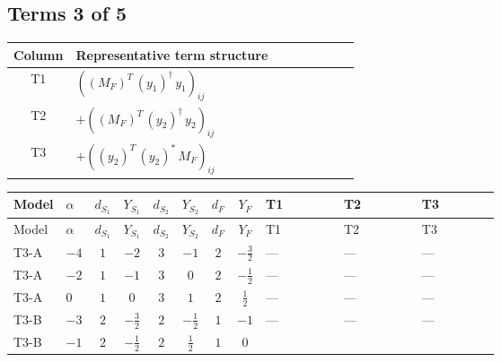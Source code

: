 \documentclass[8pt]{article}
\begin{document}
\begin{landscape}
\subsection*{Terms 3 of 5}
\begin{center}
\begin{tabular}{@{}c >{\raggedright\arraybackslash}p{0.82\linewidth}@{}}
\toprule
Column & Representative term structure \\
\midrule
T1 & \(\displaystyle \left(\left({M_F}\right)^{T}\,\left({y_1}\right)^{\dagger}\,{y_1}\right)_{ij}\) \\
\midrule
T2 & \(\displaystyle +\left(\left({M_F}\right)^{T}\,\left({y_2}\right)^{\dagger}\,{y_2}\right)_{ij}\) \\
\midrule
T3 & \(\displaystyle +\left(\left({y_2}\right)^{T}\,\left({y_2}\right)^{*}\,{M_F}\right)_{ij}\) \\
\midrule
\bottomrule
\end{tabular}
\end{center}
\smallskip
\tiny
\begin{longtable}{@{}llcccccc >{\raggedright\arraybackslash}p{0.21\linewidth} >{\raggedright\arraybackslash}p{0.21\linewidth} >{\raggedright\arraybackslash}p{0.21\linewidth}@{}}
\toprule
Model & $\alpha$ & $d_{S_1}$ & $Y_{S_1}$ & $d_{S_2}$ & $Y_{S_2}$ & $d_F$ & $Y_F$ & T1 & T2 & T3 \\
\midrule
\endfirsthead
\toprule
Model & $\alpha$ & $d_{S_1}$ & $Y_{S_1}$ & $d_{S_2}$ & $Y_{S_2}$ & $d_F$ & $Y_F$ & T1 & T2 & T3 \\
\midrule
\endhead
T3-A & $-4$ & $1$ & $-2$ & $3$ & $-1$ & $2$ & $-\frac{3}{2}$ & --- & --- & --- \\
\midrule
T3-A & $-2$ & $1$ & $-1$ & $3$ & $0$ & $2$ & $-\frac{1}{2}$ & --- & --- & --- \\
\midrule
T3-A & $0$ & $1$ & $0$ & $3$ & $1$ & $2$ & $\frac{1}{2}$ & --- & --- & --- \\
\midrule
T3-B & $-3$ & $2$ & $-\frac{3}{2}$ & $2$ & $-\frac{1}{2}$ & $1$ & $-1$ & --- & --- & --- \\
\midrule
T3-B & $-1$ & $2$ & $-\frac{1}{2}$ & $2$ & $\frac{1}{2}$ & $1$ & $0$ & \scriptsize\adjustbox{max width=\linewidth}{$\begin{gathered} \left(\left({M_F}\right)^{T}\,\left({y_1}\right)^{\dagger}\,{y_1}\right)_{ij}\end{gathered}$} & \scriptsize\adjustbox{max width=\linewidth}{$\begin{gathered} +\left(\left({M_F}\right)^{T}\,\left({y_2}\right)^{\dagger}\,{y_2}\right)_{ij}\end{gathered}$} & \scriptsize\adjustbox{max width=\linewidth}{$\begin{gathered} +\left(\left({y_2}\right)^{T}\,\left({y_2}\right)^{*}\,{M_F}\right)_{ij}\end{gathered}$} \\

\end{longtable}
\end{landscape}
\end{document}

